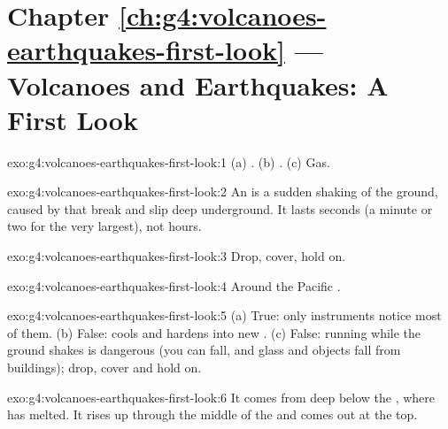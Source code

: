 \section*{Chapter \ref{ch:g4:volcanoes-earthquakes-first-look} --- Volcanoes and Earthquakes: A First Look}

\begin{solution}{exo:g4:volcanoes-earthquakes-first-look:1}
(a) . (b) . (c) Gas.
\end{solution}

\begin{solution}{exo:g4:volcanoes-earthquakes-first-look:2}
An  is a sudden shaking of the ground, caused by  that break
and slip deep underground. It lasts seconds (a minute or two for the very
largest), not hours.
\end{solution}

\begin{solution}{exo:g4:volcanoes-earthquakes-first-look:3}
Drop, cover, hold on.
\end{solution}

\begin{solution}{exo:g4:volcanoes-earthquakes-first-look:4}
Around the Pacific .
\end{solution}

\begin{solution}{exo:g4:volcanoes-earthquakes-first-look:5}
(a) True: only instruments notice most of them. (b) False:  cools and
hardens into new . (c) False: running while the ground shakes is
dangerous (you can fall, and glass and objects fall from buildings); drop,
cover and hold on.
\end{solution}

\begin{solution}{exo:g4:volcanoes-earthquakes-first-look:6}
It comes from deep below the , where  has melted. It rises up
through the middle of the  and comes out at the top.
\end{solution}

